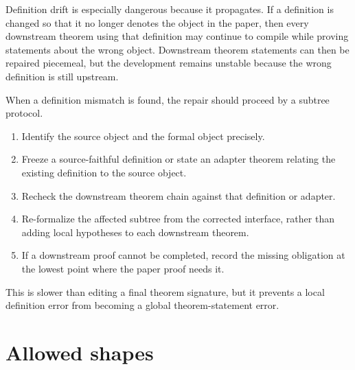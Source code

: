 \documentclass[11pt]{article}
\begin{document}
Definition drift is especially dangerous because it propagates.  If a
definition is changed so that it no longer denotes the object in the paper,
then every downstream theorem using that definition may continue to compile
while proving statements about the wrong object.  Downstream theorem statements
can then be repaired piecemeal, but the development remains unstable because
the wrong definition is still upstream.

When a definition mismatch is found, the repair should proceed by a subtree
protocol.

\begin{enumerate}
  \item Identify the source object and the formal object precisely.
  \item Freeze a source-faithful definition or state an adapter theorem
  relating the existing definition to the source object.
  \item Recheck the downstream theorem chain against that definition or adapter.
  \item Re-formalize the affected subtree from the corrected interface, rather
  than adding local hypotheses to each downstream theorem.
  \item If a downstream proof cannot be completed, record the missing obligation
  at the lowest point where the paper proof needs it.
\end{enumerate}

This is slower than editing a final theorem signature, but it prevents a local
definition error from becoming a global theorem-statement error.

\section{Allowed shapes}
\end{document}
